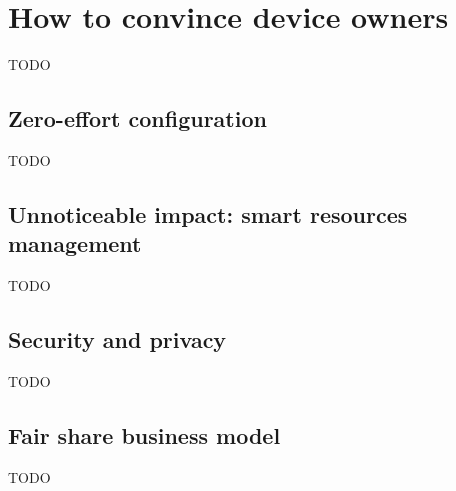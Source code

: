 \section{How to convince device owners}
TODO

\subsection{Zero-effort configuration}
TODO

\subsection{Unnoticeable impact: smart resources management}
TODO

\subsection{Security and privacy}
TODO

\subsection{Fair share business model}
TODO
